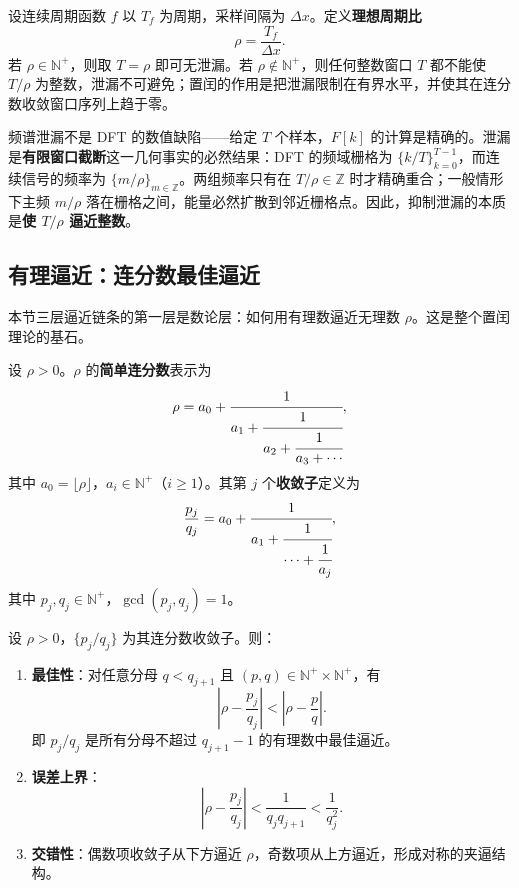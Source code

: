 \begin{definition}[理想周期比]\label{def:ideal_period_ratio}
设连续周期函数 \(f\) 以 \(T_f\) 为周期，采样间隔为 \(\Delta x\)。定义\textbf{理想周期比}
\[
\rho=\frac{T_f}{\Delta x}.
\]
若 \(\rho\in\mathbb{N}^+\)，则取 \(T=\rho\) 即可无泄漏。若 \(\rho\notin\mathbb{N}^+\)，则任何整数窗口 \(T\) 都不能使 \(T/\rho\) 为整数，泄漏不可避免；置闰的作用是把泄漏限制在有界水平，并使其在连分数收敛窗口序列上趋于零。
\end{definition}

\begin{remark}[泄漏的本质]\label{rem:leakage_essence}
频谱泄漏不是 DFT 的数值缺陷——给定 $T$ 个样本，$F[k]$ 的计算是精确的。泄漏是\textbf{有限窗口截断}这一几何事实的必然结果：DFT 的频域栅格为 $\{k/T\}_{k=0}^{T-1}$，而连续信号的频率为 $\{m/\rho\}_{m\in\mathbb{Z}}$。两组频率只有在 $T/\rho\in\mathbb{Z}$ 时才精确重合；一般情形下主频 $m/\rho$ 落在栅格之间，能量必然扩散到邻近栅格点。因此，抑制泄漏的本质是\textbf{使 $T/\rho$ 逼近整数}。
\end{remark}

\subsection{有理逼近：连分数最佳逼近}

本节三层逼近链条的第一层是数论层：如何用有理数逼近无理数 $\rho$。这是整个置闰理论的基石。

\begin{definition}[连分数与收敛子]\label{def:continued_fraction_harmonic}
设 $\rho>0$。$\rho$ 的\textbf{简单连分数}表示为
\[
\rho=a_0+\cfrac{1}{a_1+\cfrac{1}{a_2+\cfrac{1}{a_3+\cdots}}},
\]
其中 $a_0=\lfloor\rho\rfloor$，$a_i\in\mathbb{N}^+$（$i\ge 1$）。其第 $j$ 个\textbf{收敛子}定义为
\[
\frac{p_j}{q_j}=a_0+\cfrac{1}{a_1+\cfrac{1}{\cdots+\cfrac{1}{a_j}}},
\]
其中 $p_j,q_j\in\mathbb{N}^+$，$\gcd(p_j,q_j)=1$。
\end{definition}

\begin{theorem}[连分数最佳逼近定理]\label{thm:continued_fraction_best_approx_harmonic}
设 $\rho>0$，$\{p_j/q_j\}$ 为其连分数收敛子。则：
\begin{enumerate}[label=(\roman*)]
    \item \textbf{最佳性}：对任意分母 $q<q_{j+1}$ 且 $(p,q)\in\mathbb{N}^+\times\mathbb{N}^+$，有
    \[
    \left|\rho-\frac{p_j}{q_j}\right|<\left|\rho-\frac{p}{q}\right|.
    \]
    即 $p_j/q_j$ 是所有分母不超过 $q_{j+1}-1$ 的有理数中最佳逼近。
    \item \textbf{误差上界}：
    \[
    \left|\rho-\frac{p_j}{q_j}\right|<\frac{1}{q_jq_{j+1}}<\frac{1}{q_j^2}.
    \]
    \item \textbf{交错性}：偶数项收敛子从下方逼近 $\rho$，奇数项从上方逼近，形成对称的夹逼结构。
\end{enumerate}
\end{theorem}

